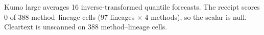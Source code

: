 Kumo large averages 16 inverse-transformed quantile forecasts. The receipt scores 0 of 388 method--lineage cells (97 lineages $\times$ 4 methods), so the scalar is null. Cleartext is unscanned on 388 method--lineage cells.
